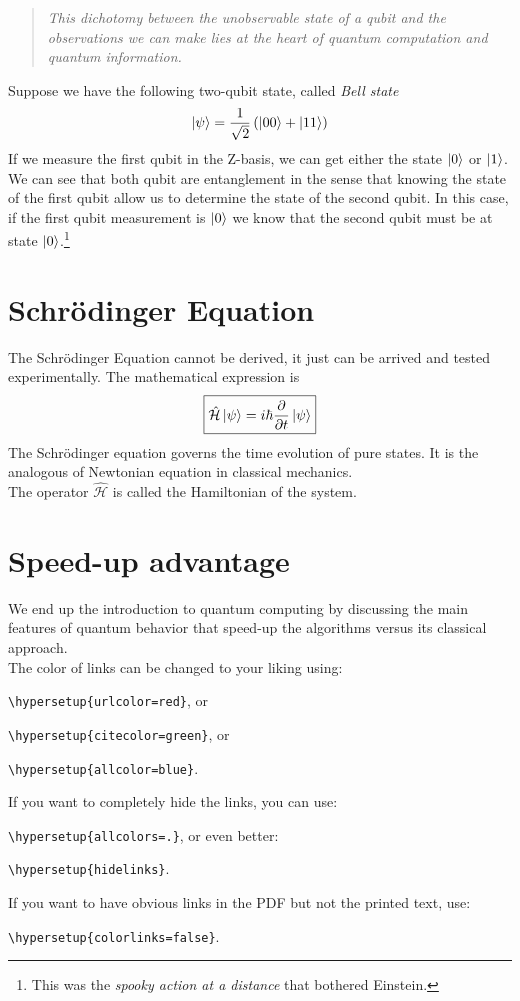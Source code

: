 \blockquote{\textit{This dichotomy between the unobservable state of a qubit and the observations we can make lies at the heart of quantum computation and quantum information.}\\
\cite{Nielsen2010QuantumInformation}}
Suppose we have the following two-qubit state, called \textit{Bell state}
\begin{equation}
    \ket{\psi} = \frac{1}{\sqrt{2}}\left(\ket{00} + \ket{11}\right)
\end{equation}
If we measure the first qubit in the Z-basis, we can get either the state $\ket{0}$ or $\ket{1}$. We can see that both qubit are entanglement in the sense that knowing the state of the first qubit allow us to determine the state of the second qubit. In this case, if the first qubit measurement is $\ket{0}$ we know that the second qubit must be at state $\ket{0}$.\footnote{This was the \textit{spooky action at a distance} that bothered Einstein.} \\

\section{Schrödinger Equation}
The Schrödinger Equation cannot be derived, it just can be arrived and tested experimentally. The mathematical expression is
\begin{equation}
    \boxed{\hat{\mathcal{H}}\ket{\psi} = i\hbar \frac{\partial}{\partial t}\ket{\psi}}
\end{equation}
The Schrödinger equation governs the time evolution of pure states. It is the analogous of Newtonian equation in classical mechanics. \\
The operator $\hat{\mathcal{H}}$ is called the Hamiltonian of the system. 
\section{Speed-up advantage}
We end up the introduction to quantum computing by discussing the main features of quantum behavior that speed-up the algorithms versus its classical approach.\\

The color of links can be changed to your liking using:

{\small\verb!\hypersetup{urlcolor=red}!}, or

{\small\verb!\hypersetup{citecolor=green}!}, or

{\small\verb!\hypersetup{allcolor=blue}!}.

\noindent If you want to completely hide the links, you can use:

{\small\verb!\hypersetup{allcolors=.}!}, or even better: 

{\small\verb!\hypersetup{hidelinks}!}.

\noindent If you want to have obvious links in the PDF but not the printed text, use:

{\small\verb!\hypersetup{colorlinks=false}!}.
